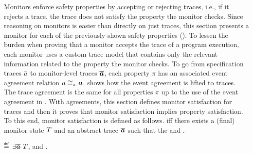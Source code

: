 \documentclass[utf8,acmsmall,review,screen,dvipsnames,anonymous]{acmart}
\begin{document}
Monitors enforce safety properties by accepting or rejecting traces, i.e., if it rejects a trace, the trace does not satisfy the property the monitor checks.
Since reasoning on monitors is easier than directly on just traces, this section presents a monitor for each of the previously shown safety properties ().
To lessen the burden when proving that a monitor accepts the trace of a program execution, each monitor uses a custom trace model that contains only the relevant information related to the property the monitor checks.
To go from specification traces $\trace$ to monitor-level traces $\abstrace$, each property $\pi$ has an associated event agreement relation $\traceagree[]{\pi}{\event}{\absevent}$.
 shows how the event agreement is lifted to traces.
The trace agreement is the same for all properties $\pi$ up to the use of the event agreement in .
With agreements, this section defines monitor satisfaction for traces and then it proves that monitor satisfaction implies property satisfaction.
To this end, monitor satisfaction is defined as follows.
 iff there exists a (final) monitor state $\monitor$ and an abstract trace $\abstrace$ such that the  and .

\begin{definition}\label{def:monsat}
  \bul{$\monsafe{\trace}{\pi}$} $\isdef$ $\exists \abstrace\ \monitor$, \iul{$\traceagree{\pi}{\trace}{\abstrace}$} and \oul{$\monitorcheck{\emptyset}{\monitor}{\abstrace}$}.
\end{definition}
\end{document}
